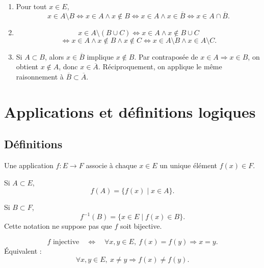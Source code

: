 \documentclass[11pt,a4paper]{article}
\newcommand{\et}{\wedge}
\newcommand{\imp}{\Rightarrow}
\newcommand{\ssi}{\Longleftrightarrow}
\begin{document}
\begin{correctionbox}[4]
\begin{enumerate}
    \item Pour tout \(x\in E\),
    \[
    x\in A\setminus B\ssi x\in A\et x\notin B\ssi x\in A\et x\in\overline B\ssi x\in A\cap\overline B.
    \]
    \item
    \[
    x\in A\setminus(B\cup C)
    \ssi x\in A\et x\notin B\cup C
    \]
    \[
    \ssi x\in A\et x\notin B\et x\notin C
    \ssi x\in A\setminus B\et x\in A\setminus C.
    \]
    \item Si \(A\subset B\), alors \(x\in\overline B\) implique \(x\notin B\). Par contraposée de \(x\in A\imp x\in B\), on obtient \(x\notin A\), donc \(x\in\overline A\). Réciproquement, on applique le même raisonnement à \(\overline B\subset\overline A\).
\end{enumerate}
\end{correctionbox}

\section{Applications et définitions logiques}

\subsection{Définitions}

\begin{definitionbox}[application]
Une application \(f:E\to F\) associe à chaque \(x\in E\) un unique élément \(f(x)\in F\).
\end{definitionbox}

\begin{definitionbox}
Si \(A\subset E\),
\[
f(A)=\{f(x)\mid x\in A\}.
\]
\end{definitionbox}

\begin{definitionbox}
Si \(B\subset F\),
\[
f^{-1}(B)=\{x\in E\mid f(x)\in B\}.
\]
Cette notation ne suppose pas que \(f\) soit bijective.
\end{definitionbox}

\begin{definitionbox}[injectivité]
\[
f\text{ injective}\quad\ssi\quad
\forall x,y\in E,\ f(x)=f(y)\imp x=y.
\]
Équivalent :
\[
\forall x,y\in E,\ x\neq y\imp f(x)\neq f(y).
\]
\end{definitionbox}
\end{document}
